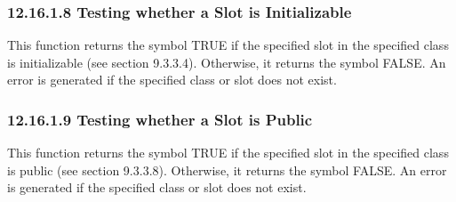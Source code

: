 \documentclass[letterpaper,10pt,english]{sphinxmanual}
\begin{document}

\begin{sphinxVerbatim}[commandchars=\\\{\}]
  
\end{sphinxVerbatim}


\subsubsection{12.16.1.8 Testing whether a Slot is Initializable}
\label{\detokenize{actions:testing-whether-a-slot-is-initializable}}
This function returns the symbol TRUE if the specified slot in the
specified class is initializable (see section 9.3.3.4). Otherwise, it
returns the symbol FALSE. An error is generated if the specified class
or slot does not exist.


\begin{sphinxVerbatim}[commandchars=\\\{\}]
  
\end{sphinxVerbatim}


\subsubsection{12.16.1.9 Testing whether a Slot is Public}
\label{\detokenize{actions:testing-whether-a-slot-is-public}}
This function returns the symbol TRUE if the specified slot in the
specified class is public (see section 9.3.3.8). Otherwise, it returns
the symbol FALSE. An error is generated if the specified class or slot
does not exist.


\begin{sphinxVerbatim}[commandchars=\\\{\}]
  
\end{sphinxVerbatim}
\end{document}
